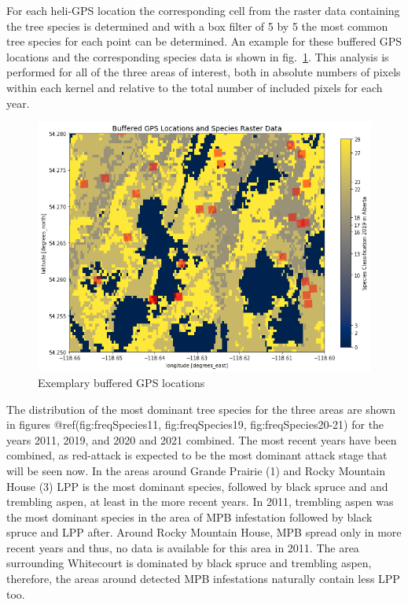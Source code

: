 \documentclass[
]{article}
\begin{document}
For each heli-GPS location the corresponding cell from the raster data containing the tree species is determined and with a box filter of 5 by 5 the most common tree species for each point can be determined. An example for these buffered GPS locations and the corresponding species data is shown in fig.~\ref{fig:bufferedPointsExample}. This analysis is performed for all of the three areas of interest, both in absolute numbers of pixels within each kernel and relative to the total number of included pixels for each year.

\begin{figure}

{\centering \includegraphics[width=0.8\linewidth]{../graphics/bufferedPointsExample} 

}

\caption{Exemplary buffered GPS locations}\label{fig:bufferedPointsExample}
\end{figure}

The distribution of the most dominant tree species for the three areas are shown in figures @ref(fig:freqSpecies11, fig:freqSpecies19, fig:freqSpecies20-21) for the years 2011, 2019, and 2020 and 2021 combined. The most recent years have been combined, as red-attack is expected to be the most dominant attack stage that will be seen now. In the areas around Grande Prairie (1) and Rocky Mountain House (3) LPP is the most dominant species, followed by black spruce and and trembling aspen, at least in the more recent years. In 2011, trembling aspen was the most dominant species in the area of MPB infestation followed by black spruce and LPP after. Around Rocky Mountain House, MPB spread only in more recent years and thus, no data is available for this area in 2011. The area surrounding Whitecourt is dominated by black spruce and trembling aspen, therefore, the areas around detected MPB infestations naturally contain less LPP too.
\end{document}
